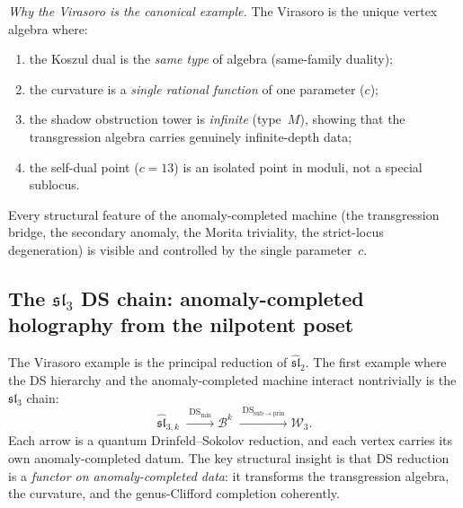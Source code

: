 \begin{computation}
\emph{Why the Virasoro is the canonical example.}
The Virasoro is the unique vertex algebra where:
\begin{enumerate}[label=\textup{(\arabic*)}]
\item the Koszul dual is the \emph{same type} of algebra
 (same-family duality);
\item the curvature is a \emph{single rational function}
 of one parameter ($c$);
\item the shadow obstruction tower is \emph{infinite} (type~$M$),
 showing that the transgression algebra carries genuinely
 infinite-depth data;
\item the self-dual point ($c=13$) is an isolated point in
 moduli, not a special sublocus.
\end{enumerate}
Every structural feature of the anomaly-completed machine (the
transgression bridge, the secondary anomaly, the Morita
triviality, the strict-locus degeneration) is visible and
controlled by the single parameter~$c$.
\end{computation}

\subsection{The $\mathfrak{sl}_3$ DS chain:
anomaly-completed holography from the nilpotent poset}

The Virasoro example is the principal reduction of
$\widehat{\mathfrak{sl}}_2$. The first example where the
DS hierarchy and the anomaly-completed machine interact
nontrivially is the $\mathfrak{sl}_3$ chain:
\[
\widehat{\mathfrak{sl}}_{3,k}
\;\xrightarrow{\;\mathrm{DS}_{\min}\;}
\mathcal B^k
\;\xrightarrow{\;\mathrm{DS}_{\mathrm{sub}\to\mathrm{prin}}\;}
\mathcal W_3.
\]
Each arrow is a quantum Drinfeld--Sokolov reduction, and each
vertex carries its own anomaly-completed datum. The key
structural insight is that DS reduction is a \emph{functor on
anomaly-completed data}: it transforms the transgression
algebra, the curvature, and the genus-Clifford completion
coherently.

